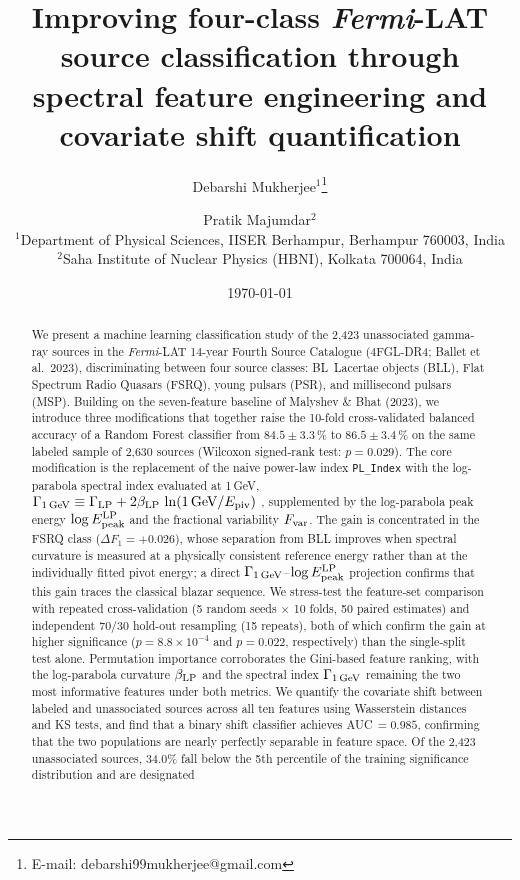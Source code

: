 \documentclass[fleqn,12pt]{article}
\title{Improving four-class \textit{Fermi}-LAT source classification through
 spectral feature engineering and covariate shift quantification}
\author{Debarshi Mukherjee$^{1}$\thanks{E-mail: debarshi99mukherjee@gmail.com}
\and Pratik Majumdar$^{2}$\\[4pt]
$^{1}$Department of Physical Sciences, IISER Berhampur, Berhampur 760003, India\\
$^{2}$Saha Institute of Nuclear Physics (HBNI), Kolkata 700064, India}
\date{\today}
\newcommand{\fermi}{\textit{Fermi}-LAT}
\newcommand{\fgl}{4FGL-DR4}
\newcommand{\GamLP}{\Gamma_{\rm 1\,GeV}}
\newcommand{\betaLP}{\beta_{\rm LP}}
\newcommand{\Epeak}{E^{\rm LP}_{\rm peak}}
\newcommand{\Fvar}{F_{\rm var}}
\newcommand{\malyshev}{Malyshev \& Bhat}
\begin{document}
\maketitle

\begin{abstract}
We present a machine learning classification study of the 2,423
unassociated gamma-ray sources in the \fermi{} 14-year Fourth Source
Catalogue (\fgl{}; Ballet et al.\ 2023), discriminating between four
source classes: BL~Lacertae objects (BLL), Flat Spectrum Radio Quasars
(FSRQ), young pulsars (PSR), and millisecond pulsars (MSP). Building on
the seven-feature baseline of \malyshev{} (2023), we introduce three
modifications that together raise the 10-fold cross-validated balanced
accuracy of a Random Forest classifier from $84.5 \pm 3.3\,\%$ to
$86.5 \pm 3.4\,\%$ on the same labeled sample of 2,630 sources
(Wilcoxon signed-rank test: $p = 0.029$). The core modification is the
replacement of the naive power-law index \texttt{PL\_Index} with the
log-parabola spectral index evaluated at 1\,GeV,
$\GamLP \equiv \Gamma_{\rm LP} + 2\betaLP\,\ln(1\,\text{GeV}/E_{\rm piv})$
\citep{Malyshev2023}, supplemented by the log-parabola peak energy
$\log\Epeak$ and the fractional variability $\Fvar$. The gain is
concentrated in the FSRQ class ($\Delta F_1 = +0.026$), whose
separation from BLL improves when spectral curvature is measured at a
physically consistent reference energy rather than at the individually
fitted pivot energy; a direct $\GamLP$--$\log\Epeak$ projection confirms
that this gain traces the classical blazar sequence. We stress-test
the feature-set comparison with repeated cross-validation (5 random
seeds $\times$ 10 folds, 50 paired estimates) and independent 70/30
hold-out resampling (15 repeats), both of which confirm the gain at
higher significance ($p = 8.8\times10^{-4}$ and $p = 0.022$,
respectively) than the single-split test alone. Permutation importance
corroborates the Gini-based feature ranking, with the log-parabola
curvature $\betaLP$ and the spectral index $\GamLP$ remaining the two
most informative features under both metrics. We quantify the
covariate shift between labeled and unassociated sources across all
ten features using Wasserstein distances and KS tests, and find that a
binary shift classifier achieves AUC\,$= 0.985$, confirming that the
two populations are nearly perfectly separable in feature space. Of
the 2,423 unassociated sources, 34.0\% fall below the 5th percentile
of the training significance distribution and are designated

\end{abstract}
\end{document}
